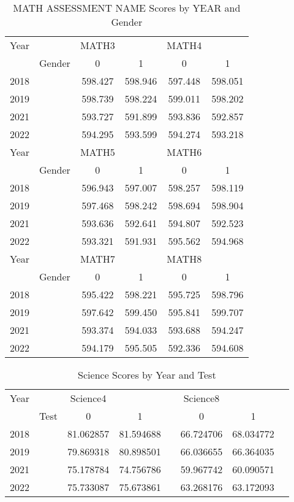 \documentclass{article}
\begin{document}
\begin{table}[ht]
\centering
\caption{MATH ASSESSMENT NAME Scores by YEAR and Gender}
\begin{tabular}{@{}llcccc@{}}
\toprule
Year &  & MATH3 &  & MATH4 &  \\
\cmidrule(lr){3-4} \cmidrule(lr){5-6}
 & Gender & 0 & 1 & 0 & 1 \\
\midrule
2018 &  & 598.427 & 598.946 & 597.448 & 598.051 \\
2019 &  & 598.739 & 598.224 & 599.011 & 598.202 \\
2021 &  & 593.727 & 591.899 & 593.836 & 592.857 \\
2022 &  & 594.295 & 593.599 & 594.274 & 593.218 \\
\midrule
Year &  & MATH5 &  & MATH6 &  \\
\cmidrule(lr){3-4} \cmidrule(lr){5-6}
 & Gender & 0 & 1 & 0 & 1 \\
\midrule
2018 &  & 596.943 & 597.007 & 598.257 & 598.119 \\
2019 &  & 597.468 & 598.242 & 598.694 & 598.904 \\
2021 &  & 593.636 & 592.641 & 594.807 & 592.523 \\
2022 &  & 593.321 & 591.931 & 595.562 & 594.968 \\
\midrule
Year &  & MATH7 &  & MATH8 &  \\
\cmidrule(lr){3-4} \cmidrule(lr){5-6}
 & Gender & 0 & 1 & 0 & 1 \\
\midrule
2018 &  & 595.422 & 598.221 & 595.725 & 598.796 \\
2019 &  & 597.642 & 599.450 & 595.841 & 599.707 \\
2021 &  & 593.374 & 594.033 & 593.688 & 594.247 \\
2022 &  & 594.179 & 595.505 & 592.336 & 594.608 \\
\bottomrule
\end{tabular}
\label{tab:math_scores}
\end{table}




\begin{table}[ht]
\centering
\caption{Science Scores by Year and Test}
\begin{tabular}{@{}llcccccc@{}}
\toprule
Year &  & Science4 &  &  & Science8 &  &  \\
\cmidrule(lr){3-4} \cmidrule(lr){6-7}
 & Test & 0 & 1 &  & 0 & 1 &  \\
\midrule
2018 &  & 81.062857 & 81.594688 &  & 66.724706 & 68.034772 &  \\
2019 &  & 79.869318 & 80.898501 &  & 66.036655 & 66.364035 &  \\
2021 &  & 75.178784 & 74.756786 &  & 59.967742 & 60.090571 &  \\
2022 &  & 75.733087 & 75.673861 &  & 63.268176 & 63.172093 &  \\
\bottomrule
\end{tabular}
\label{tab:science_scores}
\end{table}
\end{document}
